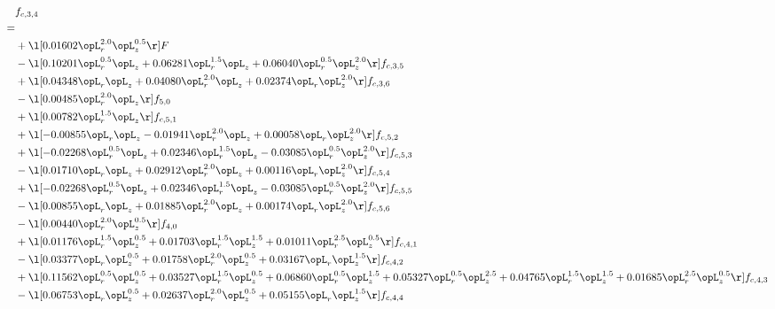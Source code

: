 \begin{alignat}{2} 
\label{eq:f_34_2} 
& f_{c,3,4} \nonumber \\ 
 = \\ 
& + \l[  0.01602 \opL_r^{2.0} \opL_z^{0.5}  \r] F \nonumber \\ 
& - \l[  0.10201 \opL_r^{0.5} \opL_z +  0.06281 \opL_r^{1.5} \opL_z +  0.06040 \opL_r^{0.5} \opL_z^{2.0}  \r] f_{c,3,5} \nonumber \\ 
& + \l[  0.04348 \opL_r \opL_z +  0.04080 \opL_r^{2.0} \opL_z +  0.02374 \opL_r \opL_z^{2.0}  \r] f_{c,3,6} \nonumber \\ 
& - \l[  0.00485 \opL_r^{2.0} \opL_z  \r] f_{5,0} \nonumber \\ 
& + \l[  0.00782 \opL_r^{1.5} \opL_z  \r] f_{c,5,1} \nonumber \\ 
& + \l[  -0.00855 \opL_r \opL_z   -0.01941 \opL_r^{2.0} \opL_z +  0.00058 \opL_r \opL_z^{2.0}  \r] f_{c,5,2} \nonumber \\ 
& + \l[  -0.02268 \opL_r^{0.5} \opL_z +  0.02346 \opL_r^{1.5} \opL_z   -0.03085 \opL_r^{0.5} \opL_z^{2.0}  \r] f_{c,5,3} \nonumber \\ 
& - \l[  0.01710 \opL_r \opL_z +  0.02912 \opL_r^{2.0} \opL_z +  0.00116 \opL_r \opL_z^{2.0}  \r] f_{c,5,4} \nonumber \\ 
& + \l[  -0.02268 \opL_r^{0.5} \opL_z +  0.02346 \opL_r^{1.5} \opL_z   -0.03085 \opL_r^{0.5} \opL_z^{2.0}  \r] f_{c,5,5} \nonumber \\ 
& - \l[  0.00855 \opL_r \opL_z +  0.01885 \opL_r^{2.0} \opL_z +  0.00174 \opL_r \opL_z^{2.0}  \r] f_{c,5,6} \nonumber \\ 
& - \l[  0.00440 \opL_r^{2.0} \opL_z^{0.5}  \r] f_{4,0} \nonumber \\ 
& + \l[  0.01176 \opL_r^{1.5} \opL_z^{0.5} +  0.01703 \opL_r^{1.5} \opL_z^{1.5} +  0.01011 \opL_r^{2.5} \opL_z^{0.5}  \r] f_{c,4,1} \nonumber \\ 
& - \l[  0.03377 \opL_r \opL_z^{0.5} +  0.01758 \opL_r^{2.0} \opL_z^{0.5} +  0.03167 \opL_r \opL_z^{1.5}  \r] f_{c,4,2} \nonumber \\ 
& + \l[  0.11562 \opL_r^{0.5} \opL_z^{0.5} +  0.03527 \opL_r^{1.5} \opL_z^{0.5} +  0.06860 \opL_r^{0.5} \opL_z^{1.5} +  0.05327 \opL_r^{0.5} \opL_z^{2.5} +  0.04765 \opL_r^{1.5} \opL_z^{1.5} +  0.01685 \opL_r^{2.5} \opL_z^{0.5}  \r] f_{c,4,3} \nonumber \\ 
& - \l[  0.06753 \opL_r \opL_z^{0.5} +  0.02637 \opL_r^{2.0} \opL_z^{0.5} +  0.05155 \opL_r \opL_z^{1.5}  \r] f_{c,4,4} \nonumber \\ 

\end{alignat}
